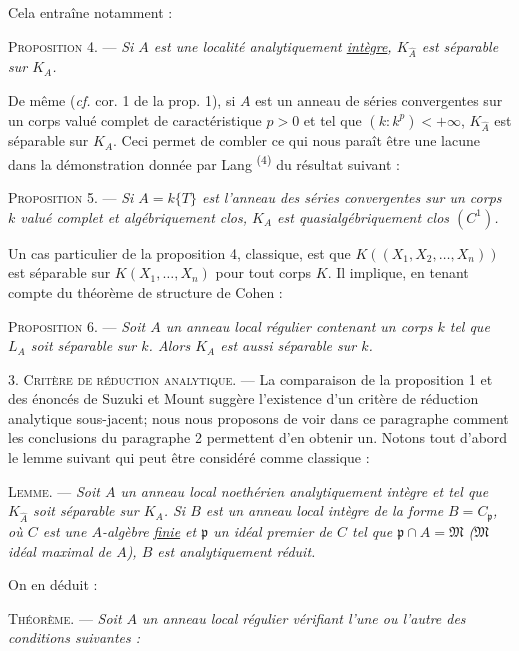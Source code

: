 Cela entraîne notamment :

\textsc{Proposition 4.} --- \textit{Si $A$ est une localité analytiquement \uline{intègre}, $K_{\widehat A}$ est séparable sur $K_A$.}

De même (\textit{cf.} cor. 1 de la prop. 1), si $A$ est un anneau de séries convergentes sur un corps valué complet de caractéristique $p>0$ et tel que $(k:k^p)<+\infty$, $K_{\widehat A}$ est séparable sur $K_A$. Ceci permet de combler ce qui nous paraît être une lacune dans la démonstration donnée par Lang \textsuperscript{(4)} du résultat suivant :

\textsc{Proposition 5.} --- \textit{Si $A=k\{T\}$ est l'anneau des séries convergentes sur un corps $k$ valué complet et algébriquement clos, $K_A$ est quasialgébriquement clos $(C^1)$.}

Un cas particulier de la proposition 4, classique, est que $K((X_1,X_2,\ldots,X_n))$ est séparable sur $K(X_1,\ldots,X_n)$ pour tout corps $K$. Il implique, en tenant compte du théorème de structure de Cohen :

\textsc{Proposition 6.} --- \textit{Soit $A$ un anneau local régulier contenant un corps $k$ tel que $L_A$ soit séparable sur $k$. Alors $K_A$ est aussi séparable sur $k$.}

3. \textsc{Critère de réduction analytique.} --- La comparaison de la proposition 1 et des énoncés de Suzuki et Mount suggère l'existence d'un critère de réduction analytique sous-jacent; nous nous proposons de voir dans ce paragraphe comment les conclusions du paragraphe 2 permettent d'en obtenir un. Notons tout d'abord le lemme suivant qui peut être considéré comme classique :

\textsc{Lemme.} --- \textit{Soit $A$ un anneau local noethérien analytiquement intègre et tel que $K_{\widehat A}$ soit séparable sur $K_A$. Si $B$ est un anneau local intègre de la forme $B=C_{\mathfrak p}$, où $C$ est une $A$-algèbre \uline{finie} et $\mathfrak p$ un idéal premier de $C$ tel que $\mathfrak p\cap A=\mathfrak M$ ($\mathfrak M$ idéal maximal de $A$), $B$ est analytiquement réduit.}

On en déduit :

\textsc{Théorème.} --- \textit{Soit $A$ un anneau local régulier vérifiant l'une ou l'autre des conditions suivantes :}

